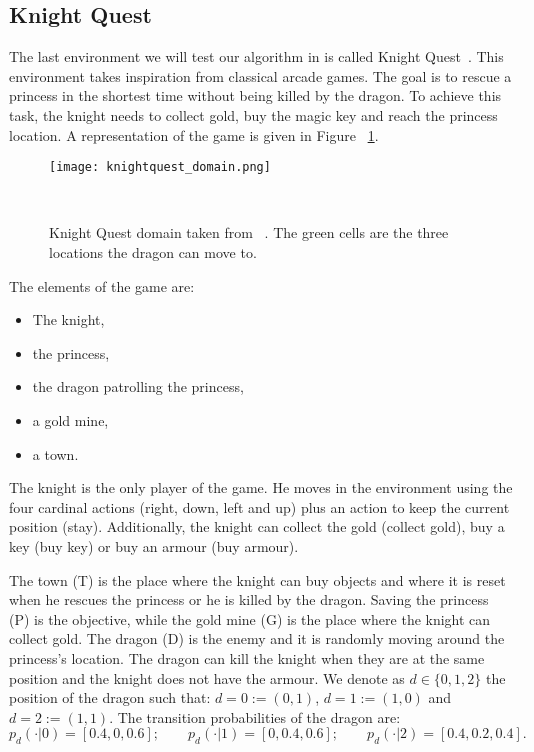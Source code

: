 \subsection{Knight Quest}
The last environment we will test our algorithm in is called Knight Quest~\cite{DBLP:conf/icml/FruitPLO18}. This environment takes inspiration from classical arcade games. The goal is to rescue a princess in the shortest time without being killed by the dragon. To achieve this task, the knight needs to collect gold, buy the magic key and reach the princess location. A representation of the game is given in Figure ~\ref{fig:knightquest_domain}.\par
\begin{figure}
 \centering \texttt{[image: knightquest\_domain.png]}
 \caption{Knight Quest domain taken from ~\cite{DBLP:conf/icml/FruitPLO18}. The green cells are the three locations the dragon can move to.} ~
\label{fig:knightquest_domain}
\end{figure}
The elements of the game are:
\begin{itemize}
\item The knight,
\item the princess,
\item the dragon patrolling the princess,
\item a gold mine,
\item a town.
\end{itemize}
The knight is the only player of the game. He moves in the environment using the four cardinal actions (\ie right, down, left and up) plus an action to keep the current position (stay). Additionally, the knight can collect the gold (collect gold), buy a key (buy key) or buy an armour (buy armour).\par
The town (T) is the place where the knight can buy objects and where it is reset when he rescues the princess or he is killed by the dragon. Saving the princess (P) is the objective, while the gold mine (G) is the place where the knight can collect gold. The dragon (D) is the enemy and it is randomly moving around the princess's location. The dragon can kill the knight when they are at the same position and the knight does not have the armour. We denote as $d \in \{0,1,2\}$ the position of the dragon such that: $d = 0 := (0,1)$, $d= 1 := (1,0)$ and $d= 2 := (1,1)$. The transition probabilities of the dragon are:
\begin{equation*}
p_d(\cdot \vert 0)=[0.4,0,0.6]; \qquad p_d(\cdot \vert 1)=[0,0.4,0.6]; \qquad p_d(\cdot \vert 2)=[0.4,0.2,0.4]. 
\end{equation*}
